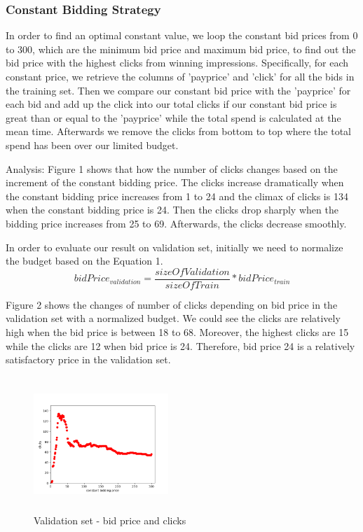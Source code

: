 \documentclass{sig-alternate-05-2015}
\begin{document}
\subsubsection{Constant Bidding Strategy}
In order to find an optimal constant value, we loop the constant bid prices from 0 to 300, which are the minimum bid price and maximum bid price, to find out the bid price with the highest clicks from winning impressions. Specifically, for each constant price, we retrieve the columns of 'payprice' and 'click' for all the bids in the training set. Then we compare our constant bid price with the 'payprice' for each bid and add up the click into our total clicks if our constant bid price is great than or equal to the 'payprice' while the total spend is calculated at the mean time. Afterwards we remove the clicks from bottom to top where the total spend has been over our limited budget.

Analysis: 
Figure 1 shows that how the number of clicks changes based on the increment of the constant bidding price.
The clicks increase dramatically when the constant bidding price increases from 1 to 24 and the climax of clicks is 134 when the constant bidding price is 24. Then the clicks drop sharply when the bidding price increases from 25 to 69. Afterwards, the clicks decrease smoothly.

In order to evaluate our result on validation set, initially we need to normalize the budget based on the Equation 1.\\

\begin{equation}bidPrice_{validation}=\frac{sizeOfValidation}{sizeOfTrain} * bidPrice_{train}\end{equation}


Figure 2 shows the changes of number of clicks depending on bid price in the validation set with a normalized budget. We could see the clicks are relatively high when the bid price is between 18 to 68. Moreover, the highest clicks are 15 while the clicks are 12 when bid price is 24. Therefore, bid price 24 is a relatively satisfactory price in the validation set.

\begin{figure}
\centering
\includegraphics[height=2in, width=2in]{images/constant_bidding.png}
\caption{Validation set - bid price and clicks}
\end{figure}
\end{document}
